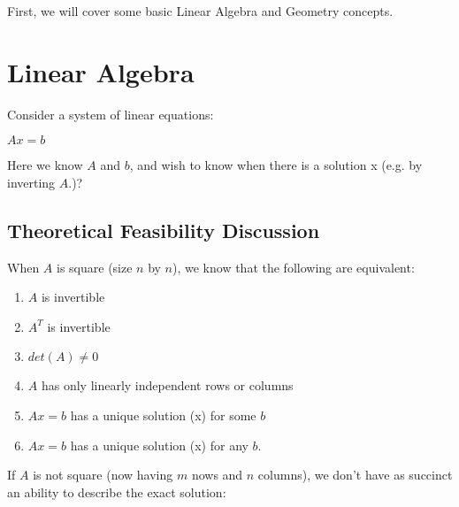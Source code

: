\documentclass{article}
\begin{document}
First, we will cover some basic Linear Algebra and Geometry concepts.

\section{Linear Algebra}

Consider a system of linear equations:

$Ax = b$ 

Here we know $A$ and $b$, and wish to know when there is a solution x (e.g. by inverting $A$.)?

\subsection{Theoretical Feasibility Discussion}
When $A$ is square (size $n$ by $n$), we know that the following are equivalent:

\begin{enumerate}

\item $A$ is invertible

\item $A^T$ is invertible

\item $det(A) \neq 0$

\item $A$ has only linearly independent rows or columns

\item $Ax = b$ has a unique solution (x) for some $b$

\item $Ax = b$ has a unique solution (x) for any $b$.
\end{enumerate}

If $A$ is not square (now having $m$ nows and $n$ columns), we 
don't have as succinct an ability to describe the exact solution:
\end{document}
